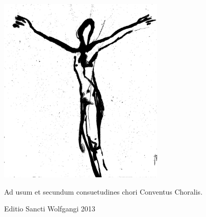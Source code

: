 \documentclass[a4paper, twoside, 12pt]{article}
\newcommand{\annusEditionis}{2013}
\begin{document}
\def\greinitialformat#1{%
{\fontsize{40}{40}\selectfont #1}%
}

\pagestyle{empty}

\setlength{\columnseprule}{1pt} %
\setlength{\columnsep}{20pt} %

\begin{titulusOfficii}
\end{titulusOfficii}


\vfill

\begin{center}
\includegraphics[height=9cm]{imagines/crux.jpg}
\end{center}

\vfill

\begin{center}
Ad usum et secundum consuetudines chori \guillemotright Conventus Choralis\guillemotleft.

Editio Sancti Wolfgangi \annusEditionis
\end{center}

\pagebreak

\renewcommand{\headrulewidth}{0pt} %
\fancyhf{}
\pagestyle{fancy}

\begin{multicols}{2}
\anteOfficiumOratio
\columnbreak

\postOfficiumOratio
\end{multicols}
\end{document}
